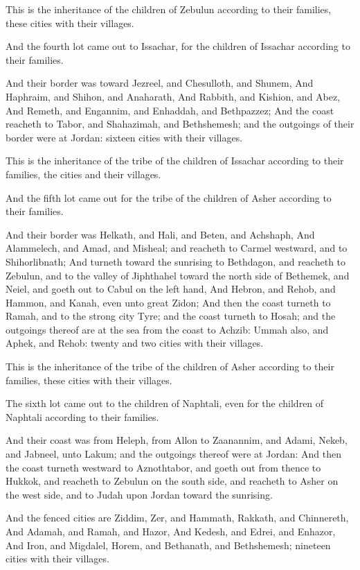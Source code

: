 \verse This is the inheritance of the children of Zebulun according to their families, these cities with their villages.

\verse And the fourth lot came out to Issachar, for the children of Issachar according to their families.

\verse And their border was toward Jezreel, and Chesulloth, and Shunem, \verse And Haphraim, and Shihon, and Anaharath, \verse And Rabbith, and Kishion, and Abez, \verse And Remeth, and Engannim, and Enhaddah, and Bethpazzez; \verse And the coast reacheth to Tabor, and Shahazimah, and Bethshemesh; and the outgoings of their border were at Jordan: sixteen cities with their villages.

\verse This is the inheritance of the tribe of the children of Issachar according to their families, the cities and their villages.

\verse And the fifth lot came out for the tribe of the children of Asher according to their families.

\verse And their border was Helkath, and Hali, and Beten, and Achshaph, \verse And Alammelech, and Amad, and Misheal; and reacheth to Carmel westward, and to Shihorlibnath; \verse And turneth toward the sunrising to Bethdagon, and reacheth to Zebulun, and to the valley of Jiphthahel toward the north side of Bethemek, and Neiel, and goeth out to Cabul on the left hand, \verse And Hebron, and Rehob, and Hammon, and Kanah, even unto great Zidon; \verse And then the coast turneth to Ramah, and to the strong city Tyre; and the coast turneth to Hosah; and the outgoings thereof are at the sea from the coast to Achzib: \verse Ummah also, and Aphek, and Rehob: twenty and two cities with their villages.

\verse This is the inheritance of the tribe of the children of Asher according to their families, these cities with their villages.

\verse The sixth lot came out to the children of Naphtali, even for the children of Naphtali according to their families.

\verse And their coast was from Heleph, from Allon to Zaanannim, and Adami, Nekeb, and Jabneel, unto Lakum; and the outgoings thereof were at Jordan: \verse And then the coast turneth westward to Aznothtabor, and goeth out from thence to Hukkok, and reacheth to Zebulun on the south side, and reacheth to Asher on the west side, and to Judah upon Jordan toward the sunrising.

\verse And the fenced cities are Ziddim, Zer, and Hammath, Rakkath, and Chinnereth, \verse And Adamah, and Ramah, and Hazor, \verse And Kedesh, and Edrei, and Enhazor, \verse And Iron, and Migdalel, Horem, and Bethanath, and Bethshemesh; nineteen cities with their villages.


